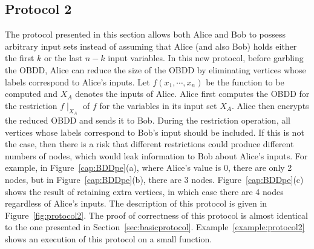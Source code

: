 \subsection{Protocol 2}
\label{subsec:protocol2}

The protocol presented in this section allows both Alice and Bob to
possess arbitrary input sets instead of assuming that Alice (and also
Bob) holds either the first $k$ or the last $n-k$ input variables.  In
this new protocol, before garbling the OBDD, Alice can reduce the size
of the OBDD by eliminating vertices whose labels correspond to Alice's
inputs.  Let $f(x_1,\cdots,x_n)$ be the function to be computed and
$X_A$ denotes the inputs of Alice. Alice first computes the OBDD  for the restriction $f
\mid_{X_A}$ of $f$ for the variables in its input
set $X_A$. Alice then encrypts the reduced OBDD and sends it to
Bob. During the restriction operation, all vertices whose labels
correspond to Bob's input should be included. If this is not the case,
then there is a risk that different restrictions could produce
different numbers of nodes, which would leak information to Bob about
Alice's inputs. For example, in Figure~\ref{cap:BDDpe}(a), where
Alice's value is $0$, there are only 2 nodes, but in
Figure~\ref{cap:BDDpe}(b), there are 3 nodes.
Figure~\ref{cap:BDDpe}(c) shows the result of retaining extra
vertices, in which case there are 4 nodes regardless of Alice's
inputs. The description of this protocol is given in
Figure~\ref{fig:protocol2}. The proof of correctness of this protocol
is almost identical to the one presented in
Section~\ref{sec:basicprotocol}. Example~\ref{example:protocol2} shows
an execution of this protocol on a small function.




